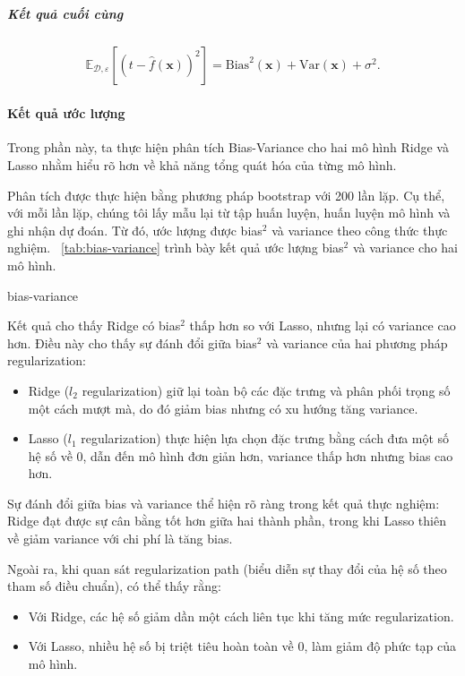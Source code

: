 \subparagraph{Kết quả cuối cùng}

\begin{align}
    \mathbb{E}_{\mathcal{D}, \varepsilon}
    \left[
        \left(t - \hat{f}(\mathbf{x}) \right)^2
    \right]
    = \mathrm{Bias}^2(\mathbf{x}) + \mathrm{Var}(\mathbf{x}) + \sigma^2.
\end{align}

\paragraph{Kết quả ước lượng}
Trong phần này, ta thực hiện phân tích Bias-Variance cho hai mô hình Ridge và
Lasso nhằm hiểu rõ hơn về khả năng tổng quát hóa của từng mô hình.

Phân tích được thực hiện bằng phương pháp bootstrap với 200 lần lặp. Cụ thể,
với mỗi lần lặp, chúng tôi lấy mẫu lại từ tập huấn luyện, huấn luyện mô hình
và ghi nhận dự đoán. Từ đó, ước lượng được bias$^2$ và variance theo công thức
thực nghiệm.
\tablename~\ref{tab:bias-variance} trình bày kết quả ước lượng bias$^2$ và
variance cho hai mô hình.

\begin{table}[htbp]
  \caption{Phân tích Bias-Variance cho Ridge và Lasso}
  \label{tab:bias-variance}
  \centering
  {bias-variance}
\end{table}

Kết quả cho thấy Ridge có bias$^2$ thấp hơn so với Lasso, nhưng lại có
variance cao hơn. Điều này cho thấy sự đánh đổi giữa bias$^2$ và variance  của
hai phương pháp regularization:
\begin{itemize}
    \item Ridge ($l_2$ regularization) giữ lại toàn bộ các đặc trưng và phân
    phối trọng số một cách mượt mà, do đó giảm bias nhưng có xu hướng tăng
    variance.
    \item Lasso ($l_1$ regularization) thực hiện lựa chọn đặc trưng bằng cách đưa
    một số hệ số về 0, dẫn đến mô hình đơn giản hơn, variance thấp hơn nhưng
    bias cao hơn.
\end{itemize}

Sự đánh đổi giữa bias và variance thể hiện rõ ràng trong kết quả thực nghiệm:
Ridge đạt được sự cân bằng tốt hơn giữa hai thành phần, trong khi Lasso thiên
về giảm variance với chi phí là tăng bias.

Ngoài ra, khi quan sát regularization path (biểu diễn sự thay đổi của hệ số
theo tham số điều chuẩn), có thể thấy rằng:
\begin{itemize}
    \item Với Ridge, các hệ số giảm dần một cách liên tục khi tăng mức
    regularization.
    \item Với Lasso, nhiều hệ số bị triệt tiêu hoàn toàn về 0, làm giảm độ
    phức tạp của mô hình.
\end{itemize}

